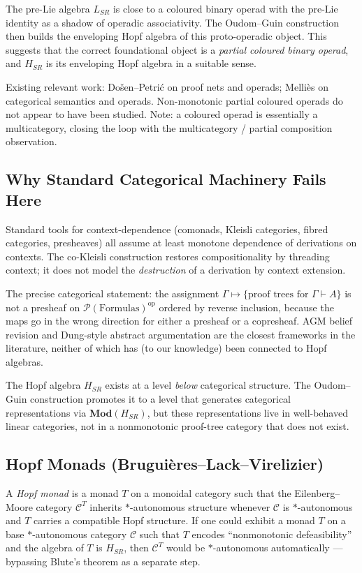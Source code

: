\documentclass[a4paper,11pt]{report}
\begin{document}
The pre-Lie algebra $L_{SR}$ is close to a coloured binary operad with the pre-Lie
identity as a shadow of operadic associativity. The Oudom--Guin construction then
builds the enveloping Hopf algebra of this proto-operadic object. This suggests that
the correct foundational object is a \emph{partial coloured binary operad}, and $H_{SR}$
is its enveloping Hopf algebra in a suitable sense.

Existing relevant work: Do\v{s}en--Petri\'c on proof nets and operads; Melli\`es on
categorical semantics and operads. Non-monotonic partial coloured operads do not appear
to have been studied. Note: a coloured operad is essentially a multicategory, closing the
loop with the multicategory / partial composition observation.

\subsection*{Why Standard Categorical Machinery Fails Here}

Standard tools for context-dependence (comonads, Kleisli categories, fibred categories,
presheaves) all assume at least monotone dependence of derivations on contexts. The
co-Kleisli construction restores compositionality by threading context; it does not model
the \emph{destruction} of a derivation by context extension.

The precise categorical statement: the assignment $\Gamma \mapsto \{\text{proof trees for } \Gamma \vdash A\}$
is not a presheaf on $\mathcal{P}(\mathrm{Formulas})^{\mathrm{op}}$ ordered by reverse
inclusion, because the maps go in the wrong direction for either a presheaf or a copresheaf.
AGM belief revision and Dung-style abstract argumentation are the closest frameworks in
the literature, neither of which has (to our knowledge) been connected to Hopf algebras.

The Hopf algebra $H_{SR}$ exists at a level \emph{below} categorical structure. The
Oudom--Guin construction promotes it to a level that generates categorical representations
via $\mathbf{Mod}(H_{SR})$, but these representations live in well-behaved linear
categories, not in a nonmonotonic proof-tree category that does not exist.

\subsection*{Hopf Monads (Bruguières--Lack--Virelizier)}

A \emph{Hopf monad} is a monad $T$ on a monoidal category such that the Eilenberg--Moore
category $\mathcal{C}^T$ inherits $*$-autonomous structure whenever $\mathcal{C}$ is
$*$-autonomous and $T$ carries a compatible Hopf structure. If one could exhibit a monad
$T$ on a base $*$-autonomous category $\mathcal{C}$ such that $T$ encodes
``nonmonotonic defeasibility'' and the algebra of $T$ is $H_{SR}$, then $\mathcal{C}^T$
would be $*$-autonomous automatically --- bypassing Blute's theorem as a separate step.
\end{document}
